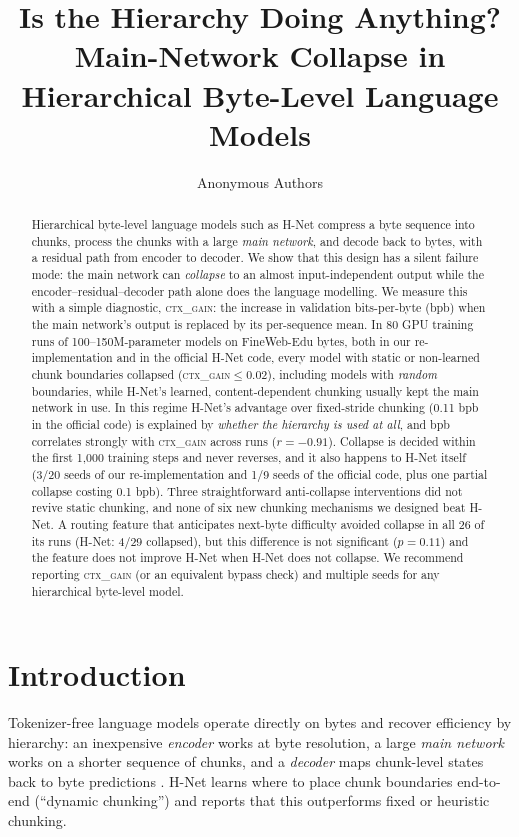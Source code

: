 \documentclass[10pt]{article}
\title{Is the Hierarchy Doing Anything?\\Main-Network Collapse in Hierarchical Byte-Level Language Models}
\author{Anonymous Authors}
\date{}
\newcommand{\ctx}{\textsc{ctx\_gain}}
\newcommand{\bpb}{bpb}
\begin{document}
\maketitle

\begin{abstract}
Hierarchical byte-level language models such as H-Net compress a byte sequence into chunks,
process the chunks with a large \emph{main network}, and decode back to bytes, with a residual
path from encoder to decoder. We show that this design has a silent failure mode: the main
network can \emph{collapse} to an almost input-independent output while the encoder--residual--decoder
path alone does the language modelling. We measure this with a simple diagnostic, \ctx{}: the
increase in validation bits-per-byte (\bpb) when the main network's output is replaced by its
per-sequence mean. In 80 GPU training runs of 100--150M-parameter models on FineWeb-Edu bytes,
both in our re-implementation and in the official H-Net code, every model with static or
non-learned chunk boundaries collapsed (\ctx{}$\le 0.02$), including models with
\emph{random} boundaries, while H-Net's learned, content-dependent chunking usually kept the main
network in use. In this regime H-Net's advantage over fixed-stride chunking (0.11 \bpb{} in the
official code) is explained by \emph{whether the hierarchy is used at all}, and \bpb{} correlates
strongly with \ctx{} across runs ($r=-0.91$). Collapse is decided within the first 1{,}000 training
steps and never reverses, and it also happens to H-Net itself (3/20 seeds of our
re-implementation and 1/9 seeds of the official code, plus one partial collapse costing
0.1 \bpb). Three straightforward anti-collapse interventions did not revive static chunking, and
none of six new chunking mechanisms we designed beat H-Net. A routing feature that anticipates
next-byte difficulty avoided collapse in all 26 of its runs (H-Net: 4/29 collapsed), but this
difference is not significant ($p=0.11$) and the feature does not improve H-Net when H-Net does not
collapse. We recommend reporting \ctx{} (or an equivalent bypass check) and multiple seeds for
any hierarchical byte-level model.
\end{abstract}

\section{Introduction}

Tokenizer-free language models operate directly on bytes and recover efficiency by
hierarchy: an inexpensive \emph{encoder} works at byte resolution, a large \emph{main network}
works on a shorter sequence of chunks, and a \emph{decoder} maps chunk-level states back to
byte predictions \citep{nawrot2021hourglass,yu2023megabyte,slagle2024spacebyte,pagnoni2024blt,hwang2025hnet}.
H-Net \citep{hwang2025hnet} learns where to place chunk boundaries end-to-end (``dynamic
chunking'') and reports that this outperforms fixed or heuristic chunking.
\end{document}
